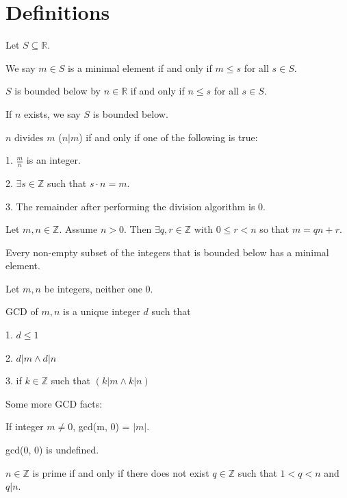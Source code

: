 \documentclass{article}
\newcommand{\Z}{\mathbb Z}
\newcommand{\R}{\mathbb R}
\begin{document}
\section{Definitions}

    Let $S \subseteq \R$.
    
    We say $m \in S$ is a minimal element if and only if $m \leq s$ for all $s \in S$.


    $S$ is bounded below by $n\in\R$ if and only if $n \leq s$ for all $s\in S$.
    
    If $n$ exists, we say $S$ is bounded below.

    
    $n$ divides $m$ ($n|m$) if and only if one of the following is true:
    
    1. $\frac{m}{n}$ is an integer.
    
    2. $\exists s \in \Z$ such that $s \cdot n = m$.
    
    3. The remainder after performing the division algorithm is 0.

    
    Let $m, n \in \Z$.
    Assume $n > 0$.
    Then $\exists q, r \in \Z$ with $0 \leq r < n$ so that $m = qn + r$.
    
    
    Every non-empty subset of the integers that is bounded below has a minimal element.


    Let $m, n$ be integers, neither one 0.
    
    GCD of $m, n$ is a unique integer $d$ such that
    
    1. $d \leq 1$
    
    2. $d|m \land d|n$
    
    3. if $k \in \Z$ such that $(k|m \land k|n)$
    
    \medskip
    
    Some more GCD facts:

    \indent\indent If integer $m \neq 0$, gcd(m, 0) = $|m|$.
    
    \indent\indent gcd(0, 0) is undefined.


    $n \in \Z$ is prime if and only if there does not exist $q \in \Z$ such that $1 < q < n$ and $q|n$.
    
\end{document}
